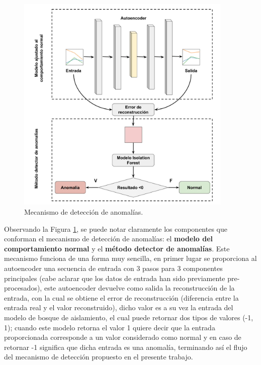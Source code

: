 \begin{figure}[H]
        \centering
            \includegraphics[width=0.92\textwidth, frame]{imagenes/Cap5/mecanismo}
        \caption{Mecanismo de detecci\'{o}n de anomal\'{i}as.}
		\label{fig:mecanismo}
\end{figure}

Observando la Figura \ref{fig:mecanismo}, se puede notar claramente los componentes que conforman el mecanismo de detecci\'{o}n de anomal\'{i}as: el \textbf{modelo del comportamiento normal} y el \textbf{m\'{e}todo detector de anomal\'{i}as}. Este mecanismo funciona de una forma muy sencilla, en primer lugar se proporciona al autoencoder una secuencia de entrada con 3 pasos para 3 componentes principales (cabe aclarar que los datos de entrada han sido previamente pre-procesados), este autoencoder devuelve como salida la reconstrucci\'{o}n de la entrada, con la cual se obtiene el error de reconstrucci\'{o}n (diferencia entre la entrada real y el valor reconstruido), dicho valor es a su vez la entrada del modelo de bosque de aislamiento, el cual puede retornar dos tipos de valores (-1, 1); cuando este modelo retorna el valor 1 quiere decir que la entrada proporcionada corresponde a un valor considerado como normal y en caso de retornar -1 significa que dicha entrada es una anomal\'{i}a, terminando as\'{i} el flujo del mecanismo de detecci\'{o}n propuesto en el presente trabajo.

